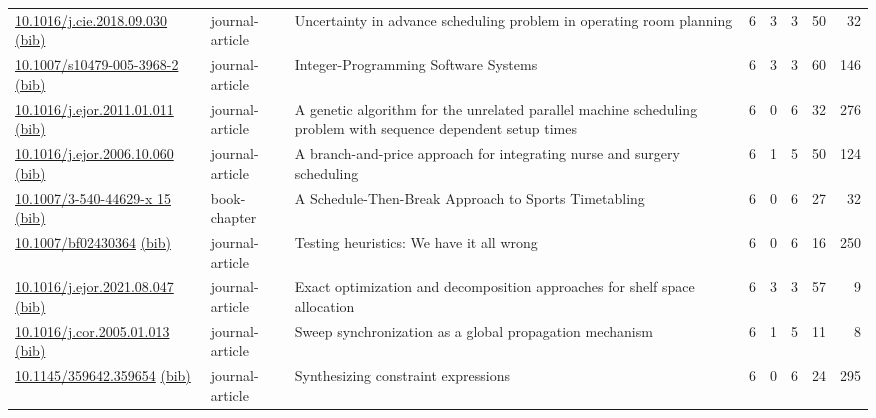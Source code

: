 {\begin{longtable}{p{5cm}lp{11cm}rrrrr}
\href{http://dx.doi.org/10.1016/j.cie.2018.09.030}{10.1016/j.cie.2018.09.030} \href{https://www.doi2bib.org/bib/10.1016/j.cie.2018.09.030}{(bib)} & journal-article & Uncertainty in advance scheduling problem in operating room planning & 6 & 3 & 3 & 50 & 32 \\
\href{http://dx.doi.org/10.1007/s10479-005-3968-2}{10.1007/s10479-005-3968-2} \href{https://www.doi2bib.org/bib/10.1007/s10479-005-3968-2}{(bib)} & journal-article & Integer-Programming Software Systems & 6 & 3 & 3 & 60 & 146 \\
\href{http://dx.doi.org/10.1016/j.ejor.2011.01.011}{10.1016/j.ejor.2011.01.011} \href{https://www.doi2bib.org/bib/10.1016/j.ejor.2011.01.011}{(bib)} & journal-article & A genetic algorithm for the unrelated parallel machine scheduling problem with sequence dependent setup times & 6 & 0 & 6 & 32 & 276 \\
\href{http://dx.doi.org/10.1016/j.ejor.2006.10.060}{10.1016/j.ejor.2006.10.060} \href{https://www.doi2bib.org/bib/10.1016/j.ejor.2006.10.060}{(bib)} & journal-article & A branch-and-price approach for integrating nurse and surgery scheduling & 6 & 1 & 5 & 50 & 124 \\
\href{http://dx.doi.org/10.1007/3-540-44629-x_15}{10.1007/3-540-44629-x 15} \href{https://www.doi2bib.org/bib/10.1007/3-540-44629-x_15}{(bib)} & book-chapter & A Schedule-Then-Break Approach to Sports Timetabling & 6 & 0 & 6 & 27 & 32 \\
\href{http://dx.doi.org/10.1007/bf02430364}{10.1007/bf02430364} \href{https://www.doi2bib.org/bib/10.1007/bf02430364}{(bib)} & journal-article & Testing heuristics: We have it all wrong & 6 & 0 & 6 & 16 & 250 \\
\href{http://dx.doi.org/10.1016/j.ejor.2021.08.047}{10.1016/j.ejor.2021.08.047} \href{https://www.doi2bib.org/bib/10.1016/j.ejor.2021.08.047}{(bib)} & journal-article & Exact optimization and decomposition approaches for shelf space allocation & 6 & 3 & 3 & 57 & 9 \\
\href{http://dx.doi.org/10.1016/j.cor.2005.01.013}{10.1016/j.cor.2005.01.013} \href{https://www.doi2bib.org/bib/10.1016/j.cor.2005.01.013}{(bib)} & journal-article & Sweep synchronization as a global propagation mechanism & 6 & 1 & 5 & 11 & 8 \\
\href{http://dx.doi.org/10.1145/359642.359654}{10.1145/359642.359654} \href{https://www.doi2bib.org/bib/10.1145/359642.359654}{(bib)} & journal-article & Synthesizing constraint expressions & 6 & 0 & 6 & 24 & 295 \\

\end{longtable}}
